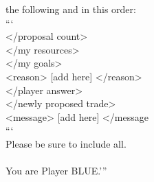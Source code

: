 \begin{codebox}[title= Prompts for Sell\&Buy]
the following and in this order:\\```\\<proposal count> [add here (inclusive of current)] </proposal count>\\<my resources> [add here] </my resources>\\<my goals> [add here] </my goals>\\<reason> [add here] </reason>\\<player answer> [add here] </player answer>\\<newly proposed trade> [add here] </newly proposed trade>\\<message> [add here] </message\\```\\Please be sure to include all.\\\\You are Player BLUE.'''
\end{codebox}
